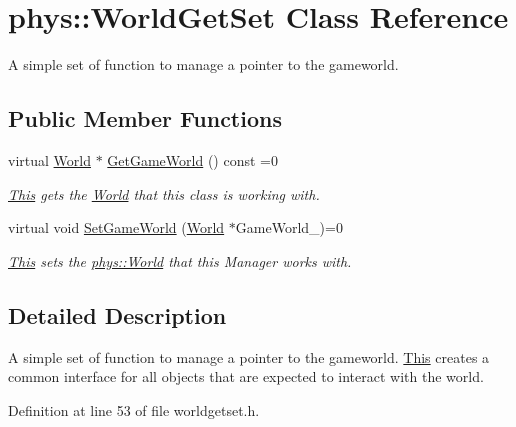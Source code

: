 \hypertarget{classphys_1_1WorldGetSet}{
\section{phys::WorldGetSet Class Reference}
\label{dc/d4f/classphys_1_1WorldGetSet}
}


A simple set of function to manage a pointer to the gameworld.  


\subsection*{Public Member Functions}
\begin{DoxyCompactItemize}
\item 
virtual \hyperlink{classphys_1_1World}{World} $\ast$ \hyperlink{classphys_1_1WorldGetSet_ae11f48a9152834423647ea44e7fd7ee5}{GetGameWorld} () const =0
\begin{DoxyCompactList}\small\item\em \hyperlink{structThis}{This} gets the \hyperlink{classphys_1_1World}{World} that this class is working with. \item\end{DoxyCompactList}\item 
\hypertarget{classphys_1_1WorldGetSet_a03f596502ff3436f249169833ae7f9c6}{
virtual void \hyperlink{classphys_1_1WorldGetSet_a03f596502ff3436f249169833ae7f9c6}{SetGameWorld} (\hyperlink{classphys_1_1World}{World} $\ast$GameWorld\_\-)=0}
\label{dc/d4f/classphys_1_1WorldGetSet_a03f596502ff3436f249169833ae7f9c6}

\begin{DoxyCompactList}\small\item\em \hyperlink{structThis}{This} sets the \hyperlink{classphys_1_1World}{phys::World} that this Manager works with. \item\end{DoxyCompactList}\end{DoxyCompactItemize}


\subsection{Detailed Description}
A simple set of function to manage a pointer to the gameworld. \hyperlink{structThis}{This} creates a common interface for all objects that are expected to interact with the world. 

Definition at line 53 of file worldgetset.h.



